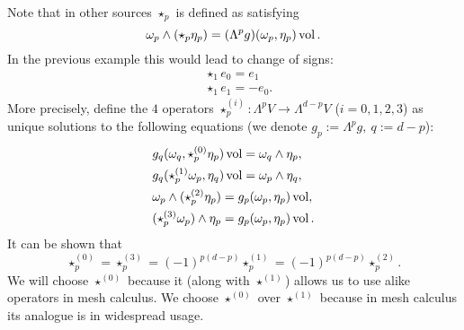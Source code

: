 \begin{remark}
  Note that in other sources $\star_p$ is defined as satisfying
  \begin{equation}
    \omega_p \wedge (\star_p \eta_p) = (\Lambda^p g)(\omega_p, \eta_p) \mathop{\rm vol}\nolimits.
  \end{equation}
  In the previous example this would lead to change of signs:
  \begin{subequations}
    \begin{align}
      & \star_1 e_0 = e_1 \\
      & \star_1 e_1 = - e_0.
    \end{align}
  \end{subequations}
  More precisely, define the $4$ operators
  $\star^{(i)}_p \colon \Lambda^p V \to \Lambda^{d - p} V$ ($i = 0, 1, 2, 3$)
  as unique solutions to the following equations
  (we denote $g_p := \Lambda^p g,\ q := d - p$):
  \begin{subequations}
    \begin{align}
      & g_q(\omega_q, \star^{(0)}_p \eta_p) \mathop{\rm vol}\nolimits = \omega_q \wedge \eta_p, \\
      & g_q(\star^{(1)}_p \omega_p, \eta_q) \mathop{\rm vol}\nolimits = \omega_p \wedge \eta_q, \\
      & \omega_p \wedge (\star^{(2)}_p \eta_p) = g_p(\omega_p, \eta_p) \mathop{\rm vol}\nolimits, \\
      & (\star^{(3)}_p \omega_p) \wedge \eta_p = g_p(\omega_p, \eta_p) \mathop{\rm vol}\nolimits.
    \end{align}
  \end{subequations}
  It can be shown that
  \begin{equation}
    \star^{(0)}_p
    = \star^{(3)}_p
    = (-1)^{p (d - p)} \star^{(1)}_p
    = (-1)^{p (d - p)} \star^{(2)}_p.
  \end{equation}
  We will choose $\star^{(0)}$ because it (along with $\star^{(1)}$) allows us
  to use alike operators in mesh calculus.
  We choose $\star^{(0)}$ over $\star^{(1)}$ because in mesh calculus its
  analogue is in widespread usage.
\end{remark}

